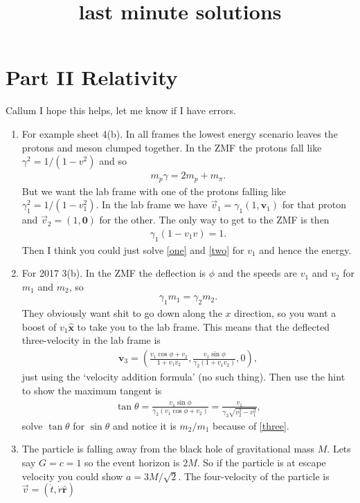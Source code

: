 \documentclass{article}
\title{last minute solutions}
\begin{document}
\maketitle
\section{Part II Relativity}
Callum I hope this helps, let me know if I have errors.
\begin{enumerate}
	\item For example sheet 4(b). In all frames the lowest energy scenario leaves the protons and meson clumped together. In the ZMF the protons fall like $\gamma^2=1/\left( 1-v^2 \right)$ and so
		\begin{eqnarray} \label{one}
			m_p \gamma=2m_p+m_\pi.
\end{eqnarray}
But we want the lab frame with one of the protons falling like $\gamma_1^2=1/\left( 1- v_1^2\right)$. In the lab frame we have $\overrightarrow{v}_1=\gamma_1\left( 1,\mathbf{v}_1 \right)$ for that proton and $\overrightarrow{v}_2=\left( 1,\mathbf{0} \right)$ for the other. The only way to get to the ZMF is then
\begin{eqnarray}\label{two}
	\gamma_1 \left( 1-v_1 v \right)=1.
\end{eqnarray}
Then I think you could just solve \eqref{one} and \eqref{two} for $v_1$ and hence the energy.
\item For 2017 3(b). In the ZMF the deflection is $\phi$ and the speeds are $v_1$ and $v_2$ for $m_1$ and $m_2$, so
	\begin{eqnarray}\label{three}
		\gamma_1 m_1=\gamma_2 m_2.
	\end{eqnarray}
They obviously want shit to go down along the $x$ direction, so you want a boost of $v_1 \hat{\mathbf{x}}$ to take you to the lab frame. This means that the deflected three-velocity in the lab frame is
\begin{eqnarray}
	\mathbf{v}_3=\left( \frac{v_1 \cos\phi+v_2}{1+v_1v_2}, \frac{v_1\sin\phi}{\gamma_2 \left( 1+v_1v_2 \right)},0 \right),
\end{eqnarray}
just using the `velocity addition formula' (no such thing). Then use the hint to show the maximum tangent is
\begin{eqnarray}
	\tan\theta=\frac{v_1\sin\phi}{\gamma_2 \left( v_1\cos\phi+v_2 \right)}=\frac{v_1}{\gamma_2\sqrt{v_2^2-v_1^2}},
\end{eqnarray}
solve $\tan\theta$ for $\sin\theta$ and notice it is $m_2/m_1$ because of \eqref{three}.
\item The particle is falling away from the black hole of gravitational mass $M$. Lets say $G=c=1$ so the event horizon is $2M$. So if the particle is at escape velocity you could show $a=3M/\sqrt{2}$. The four-velocity of the particle is $\overrightarrow{v}=\left( \dot{t},\dot{r}\hat{\mathbf{r}} \right)$

\end{enumerate}
\end{document}

